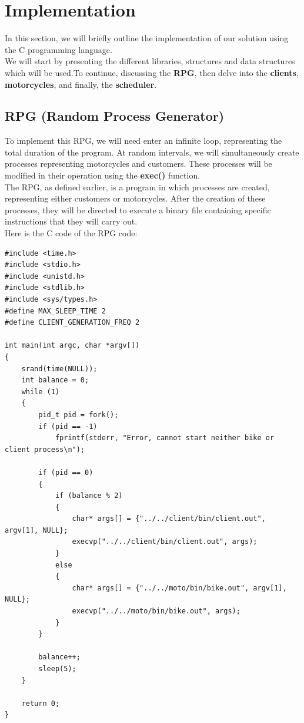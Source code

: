 \section{Implementation}

In this section, we will briefly outline the implementation of our solution using the C programming language.\\ We will start by presenting the different libraries, structures and data structures which will be used.To continue, discussing the \textbf{RPG}, then delve into the \textbf{clients}, \textbf{motorcycles}, and finally, the \textbf{scheduler}.\\

\newpage

\subsection{RPG (Random Process Generator)}
To implement this RPG, we will need   enter an infinite loop, representing the total duration of the program. At random intervals, we will simultaneously create processes representing motorcycles and customers. These processes will be modified in their operation using the \textbf{exec()} function.\\

The RPG, as defined earlier, is a program in which processes are created, representing either customers or motorcycles. After the creation of these processes, they will be directed to execute a binary file containing specific instructions that they will carry out.\\Here is the C code of the RPG code:%

\begin{lstlisting}[style=customc, caption={  code of  RPG}]
#include <time.h>
#include <stdio.h>
#include <unistd.h>
#include <stdlib.h>
#include <sys/types.h>
#define MAX_SLEEP_TIME 2
#define CLIENT_GENERATION_FREQ 2

int main(int argc, char *argv[])
{
    srand(time(NULL));
    int balance = 0;
    while (1)
    {
        pid_t pid = fork();
        if (pid == -1)
            fprintf(stderr, "Error, cannot start neither bike or client process\n");

        if (pid == 0)
        {
            if (balance % 2)
            {
                char* args[] = {"../../client/bin/client.out", argv[1], NULL};
                execvp("../../client/bin/client.out", args);
            }
            else
            {
                char* args[] = {"../../moto/bin/bike.out", argv[1], NULL};
                execvp("../../moto/bin/bike.out", args);
            }
        }

        balance++;
        sleep(5);
    }

    return 0;
}


\end{lstlisting}

